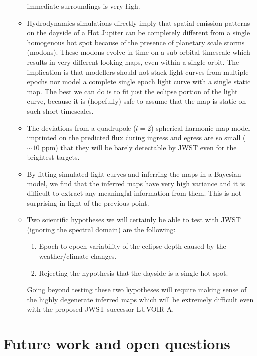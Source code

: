 \documentclass[12pt,dvipsnames]{report}
\begin{document}
\begin{itemize}
\begin{itemize}
    immediate surroundings is very high.
    \item  Hydrodynamics simulations directly imply that spatial emission patterns 
    on the dayside of a Hot Jupiter can be completely different from a single homogenous 
    hot spot because of the presence of planetary scale storms (modons). These modons 
    evolve in time on a sub-orbital timescale which results in very different-looking 
    maps, even within a single orbit. The implication is that modellers should not stack light 
    curves from multiple epochs nor model a complete single epoch light curve with a 
    single static map. The best we can do is to fit just the eclipse portion of the light curve,
    because it is (hopefully)  safe to assume that the map is static on such short timescales.
    \item The deviations from a quadrupole ($l=2$) spherical harmonic map model imprinted 
    on the predicted flux during ingress and egress are so small ($\sim 10$ ppm) that 
    they will be barely detectable by JWST even for the brightest targets. 
    \item By fitting simulated light curves and inferring the maps in a Bayesian model,
    we find that the inferred maps have very high variance and it is difficult to 
    extract any meaningful information from them. This is not surprising in light of the 
    previous point.
    \item Two scientific hypotheses we will certainly be able to test with JWST (ignoring the spectral
    domain) are the following:
    \begin{enumerate}
    \item Epoch-to-epoch variability of the eclipse depth caused by the weather/climate 
        changes.
    \item Rejecting the hypothesis that the dayside is a single hot spot.
    \end{enumerate}
    Going beyond testing these two hypotheses will require making sense of the highly degenerate 
    inferred maps which will be extremely difficult even with the proposed JWST successor 
    LUVOIR-A. 
\end{itemize}
\end{itemize}

\section{Future work and open questions}
\end{document}

